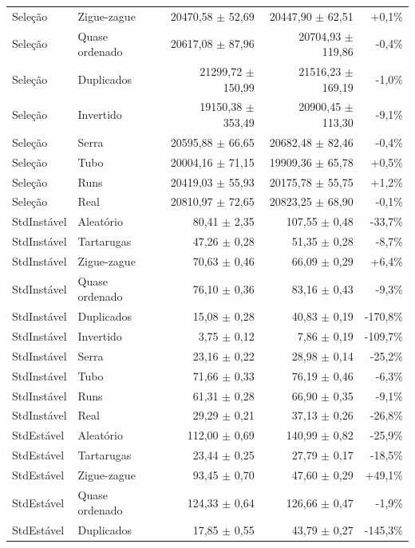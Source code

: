 \begin{table}[ht]
\begin{tabular}{llrrr}
Seleção & Zigue-zague & 20470,58 $\pm$ 52,69 & 20447,90 $\pm$ 62,51 & +0,1\% \\
Seleção & Quase ordenado & 20617,08 $\pm$ 87,96 & 20704,93 $\pm$ 119,86 & -0,4\% \\
Seleção & Duplicados & 21299,72 $\pm$ 150,99 & 21516,23 $\pm$ 169,19 & -1,0\% \\
Seleção & Invertido & 19150,38 $\pm$ 353,49 & 20900,45 $\pm$ 113,30 & -9,1\% \\
Seleção & Serra & 20595,88 $\pm$ 66,65 & 20682,48 $\pm$ 82,46 & -0,4\% \\
Seleção & Tubo & 20004,16 $\pm$ 71,15 & 19909,36 $\pm$ 65,78 & +0,5\% \\
Seleção & Runs & 20419,03 $\pm$ 55,93 & 20175,78 $\pm$ 55,75 & +1,2\% \\
Seleção & Real & 20810,97 $\pm$ 72,65 & 20823,25 $\pm$ 68,90 & -0,1\% \\
StdInstável & Aleatório & 80,41 $\pm$ 2,35 & 107,55 $\pm$ 0,48 & -33,7\% \\
StdInstável & Tartarugas & 47,26 $\pm$ 0,28 & 51,35 $\pm$ 0,28 & -8,7\% \\
StdInstável & Zigue-zague & 70,63 $\pm$ 0,46 & 66,09 $\pm$ 0,29 & +6,4\% \\
StdInstável & Quase ordenado & 76,10 $\pm$ 0,36 & 83,16 $\pm$ 0,43 & -9,3\% \\
StdInstável & Duplicados & 15,08 $\pm$ 0,28 & 40,83 $\pm$ 0,19 & -170,8\% \\
StdInstável & Invertido & 3,75 $\pm$ 0,12 & 7,86 $\pm$ 0,19 & -109,7\% \\
StdInstável & Serra & 23,16 $\pm$ 0,22 & 28,98 $\pm$ 0,14 & -25,2\% \\
StdInstável & Tubo & 71,66 $\pm$ 0,33 & 76,19 $\pm$ 0,46 & -6,3\% \\
StdInstável & Runs & 61,31 $\pm$ 0,28 & 66,90 $\pm$ 0,35 & -9,1\% \\
StdInstável & Real & 29,29 $\pm$ 0,21 & 37,13 $\pm$ 0,26 & -26,8\% \\
StdEstável & Aleatório & 112,00 $\pm$ 0,69 & 140,99 $\pm$ 0,82 & -25,9\% \\
StdEstável & Tartarugas & 23,44 $\pm$ 0,25 & 27,79 $\pm$ 0,17 & -18,5\% \\
StdEstável & Zigue-zague & 93,45 $\pm$ 0,70 & 47,60 $\pm$ 0,29 & +49,1\% \\
StdEstável & Quase ordenado & 124,33 $\pm$ 0,64 & 126,66 $\pm$ 0,47 & -1,9\% \\
StdEstável & Duplicados & 17,85 $\pm$ 0,55 & 43,79 $\pm$ 0,27 & -145,3\% \\

\end{tabular}
\end{table}

